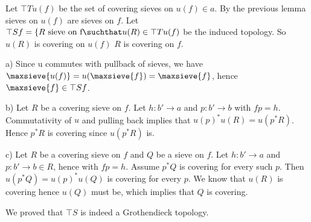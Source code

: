 \begin{definition}
Let $\top{T}{u(f)}$ be the set of covering sieves on $u(f) \in a$.
By the previous lemma sieves on $u(f)$ are sieves on $f$.
Let $\top{S}{f} = \{R \mbox{ sieve on f} \suchthat u(R) \in \top{T}{u(f)}$ be the induced topology.
So $u(R)$ is covering on $u(f)$ \iff $R$ is covering on $f$.

a) Since u commutes with pullback of sieves, 
we have $\maxsieve{u(f)} = u(\maxsieve{f}) = \maxsieve{f}$,
hence $\maxsieve{f} \in \top{S}{f}$.

b) Let $R$ be a covering sieve on $f$.
Let $h:b'\rightarrow a$
and $p:b' \rightarrow b$ with $fp = h$.
Commutativity of $u$ and pulling back implies that $u(p)^*u(R) = u(p^*R)$.
Hence $p^*R$ is covering since $u(p^*R)$ is.

c) Let $R$ be a covering sieve on $f$
and $Q$ be a sieve on $f$.
Let $h:b'\rightarrow a$
and $p:b' \rightarrow b \in R$,
hence with $fp = h$.
Assume $p^*Q$ is covering for every such $p$.
Then $u(p^*Q) = u(p)^*u(Q)$ is covering for every $p$.
We know that $u(R)$ is covering hence $u(Q)$ must be, which implies that $Q$ is covering.

We proved that $\top{S}$ is indeed a Grothendieck topology.
\end{definition}